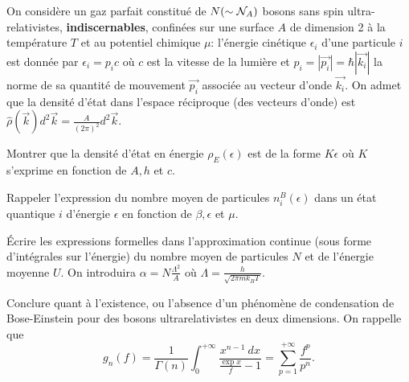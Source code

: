 On considère un gaz parfait constitué de $N (\sim {\cal N}_A)$ bosons sans spin ultra-relativistes, {\bf indiscernables}, confinées sur une surface $A$ de dimension 2 à la température $T$ et au potentiel chimique $\mu$: l'énergie cinétique $\epsilon_i$ d'une particule $i$ est donnée par $\epsilon_i= p_ic$ où $c$ est la vitesse de la lumière et $p_i=|\Vec{p_i}|=\hbar |\Vec{k_i}|$ la norme de sa quantité de mouvement $\Vec{p_i}$ associée au vecteur d'onde $\Vec{k_i}$. On admet que la densité d'état dans l'espace réciproque (des vecteurs d'onde) est $\hat{\rho}(\Vec{k})d^2 \Vec{k}= \frac{A}{(2 \pi)^2} d^2 \Vec{k}$.

\question Montrer que la densité d'état en énergie $\rho_E(\epsilon)$ est de la forme $K \epsilon$ où $K$ s'exprime en fonction de $A, h$ et $c$. 

\question Rappeler l'expression du nombre moyen de particules $n_i^B(\epsilon)$ dans un état quantique $i$ d'énergie $\epsilon$ en fonction de $\beta, \epsilon$ et $\mu$.

\question \'Ecrire les expressions formelles dans l'approximation continue (sous forme d'intégrales sur l'énergie)  du nombre moyen de particules $N$ et de l'énergie moyenne $U$. On introduira $\alpha=N\frac{\Lambda^2}{A}$ où $\Lambda=\frac{h}{\sqrt{2\pi m k_B T}}$.

\question
Conclure quant à l'existence, ou l'absence d'un phénomène de condensation de Bose-Einstein pour des bosons ultrarelativistes en deux dimensions. On rappelle que
\begin{equation}
g_n(f)=\frac{1}{\Gamma (n)} \int_0^{+\infty} \frac{x^{n-1}\ dx}{\frac{\exp x}{f}-1}=\sum\limits_{p=1}^{+\infty} \frac{f^p}{p^n}.
\end{equation}
